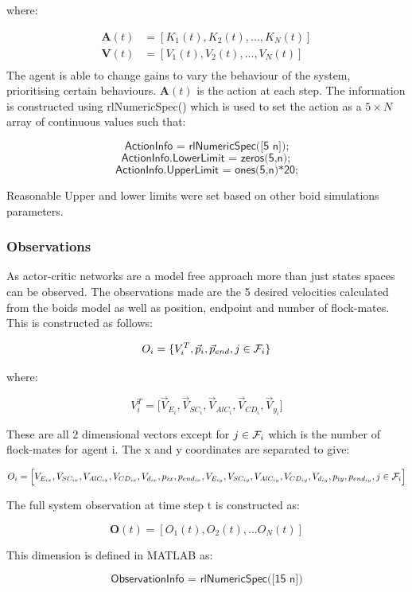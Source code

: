 where:


\begin{equation}
\begin{split}
    {{\textbf{A}}}(t) &= [K_1(t), K_2(t),..., K_N(t)]\\
    {{\textbf{V}}}(t) &= [V_1(t), V_2(t),..., V_N(t)]\\
    \end{split}
\end{equation}
The agent is able to change gains to vary the behaviour of the system, prioritising certain behaviours. $\textbf{A}(t)$ is the action at each step. The information is constructed using rlNumericSpec() which is used to set the action as a $5\times N$ array of continuous values such that:

\[\textsf{ActionInfo = rlNumericSpec([5 n]);}\]
\[\textsf{ActionInfo.LowerLimit = zeros(5,n)};\]
\[\textsf{ActionInfo.UpperLimit =  ones(5,n)*20;}\]

Reasonable Upper and lower limits were set based on other boid simulations parameters.
\subsubsection{Observations}
As actor-critic networks are a model free approach more than just states spaces can be observed. The observations made are the 5 desired velocities calculated from the boids model as well as position, endpoint and number of flock-mates. This is constructed as follows:

\[O_i = \{V^T_i,\vec{p}_i,\vec{p}_{end},j\in{\cal{F}}_i\}\]

where:

\[V^T_i = \Big[\vec{V}_{E_i}, \vec{V}_{SC_i}, \vec{V}_{AlC_i}, \vec{V}_{CD_i}, \vec{V}_{y_i}\Big]\]

These are all 2 dimensional vectors except for $j\in{\cal{F}}_i$ which is the number of flock-mates for agent i. The x and y coordinates are separated to give:

\[O_i = \Big[V_{E_{ix}}, V_{SC_{ix}}, V_{AlC_{ix}}, V_{CD_{ix}}, V_{d_{ix}}, p_{ix},p_{end_{ix}}, V_{E_{iy}}, V_{SC_{iy}}, V_{AlC_{iy}}, V_{CD_{iy}}, V_{d_{iy}},p_{iy},p_{end_{iy}},j\in{\cal{F}}_i\Big]\]

The full system observation at time step t is constructed as:

\[\textbf{O}(t) = [O_1(t),O_2(t),...O_N(t)]\]

This dimension is defined in MATLAB as:

\[\textsf{ObservationInfo = rlNumericSpec([15 n]})\]

